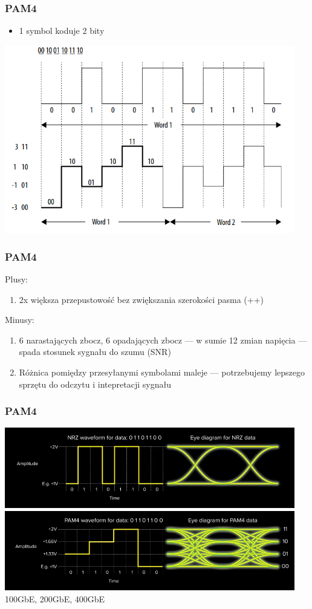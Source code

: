 \documentclass{beamer}
\begin{document}
\begin{frame}
\frametitle{PAM4}
\begin{itemize}
    \item 1 symbol koduje 2 bity
\end{itemize}
\includegraphics[width=0.95\textwidth]{images/pam4_vs_nrz.png}
\end{frame}

\begin{frame}
\frametitle{PAM4}
Plusy:
\begin{enumerate}
    \item 2x większa przepustowość bez zwiększania szerokości pasma (++)
\end{enumerate}

Minusy:
\begin{enumerate}
    \item 6 narastających zbocz, 6 opadających zbocz --- w sumie 12 zmian napięcia --- spada stosunek sygnału do szumu (SNR)
    \item Różnica pomiędzy przesyłanymi symbolami maleje --- potrzebujemy lepszego sprzętu do odczytu i intepretacji sygnału
\end{enumerate}
\end{frame}

\begin{frame}
\frametitle{PAM4}
\includegraphics[width=0.95\textwidth]{images/eye_diagram_nrz.png}
\includegraphics[width=0.95\textwidth]{images/eye_diagram_pam4.png}
100GbE, 200GbE, 400GbE
\end{frame}
\end{document}
